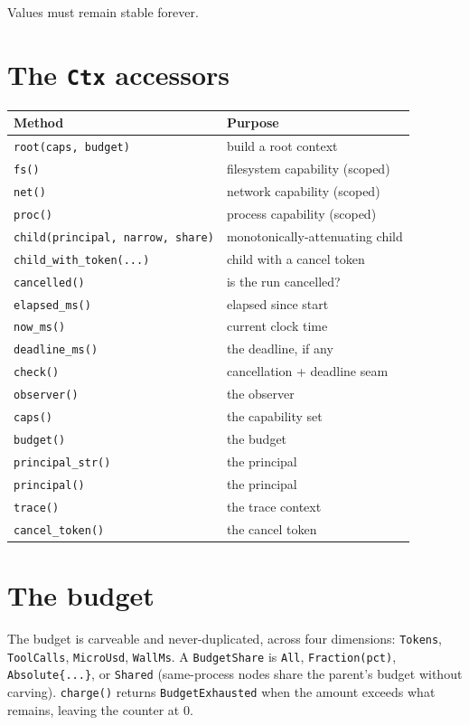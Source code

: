 \documentclass[
	fontsize=10pt,
	twoside=false,
	secnumdepth=2,
	open=any,
]{kaobook}
\begin{document}
Values must remain stable forever.

\section{The \texttt{Ctx} accessors}

\begin{longtable}{@{}ll@{}}
\toprule
\textbf{Method} & \textbf{Purpose} \\
\midrule
\endhead
\texttt{root(caps, budget)} & build a root context \\
\texttt{fs()} & filesystem capability (scoped) \\
\texttt{net()} & network capability (scoped) \\
\texttt{proc()} & process capability (scoped) \\
\texttt{child(principal, narrow, share)} & monotonically-attenuating child \\
\texttt{child\_with\_token(...)} & child with a cancel token \\
\texttt{cancelled()} & is the run cancelled? \\
\texttt{elapsed\_ms()} & elapsed since start \\
\texttt{now\_ms()} & current clock time \\
\texttt{deadline\_ms()} & the deadline, if any \\
\texttt{check()} & cancellation + deadline seam \\
\texttt{observer()} & the observer \\
\texttt{caps()} & the capability set \\
\texttt{budget()} & the budget \\
\texttt{principal\_str()} & the principal \\
\texttt{principal()} & the principal \\
\texttt{trace()} & the trace context \\
\texttt{cancel\_token()} & the cancel token \\
\bottomrule
\end{longtable}

\section{The budget}

The budget is carveable and never-duplicated, across four dimensions:
\texttt{Tokens}, \texttt{ToolCalls}, \texttt{MicroUsd}, \texttt{WallMs}.
A \texttt{BudgetShare} is \texttt{All}, \texttt{Fraction(pct)},
\texttt{Absolute\{...\}}, or \texttt{Shared} (same-process nodes share the
parent's budget without carving). \texttt{charge()} returns
\texttt{BudgetExhausted} when the amount exceeds what remains, leaving the
counter at 0.
\end{document}
